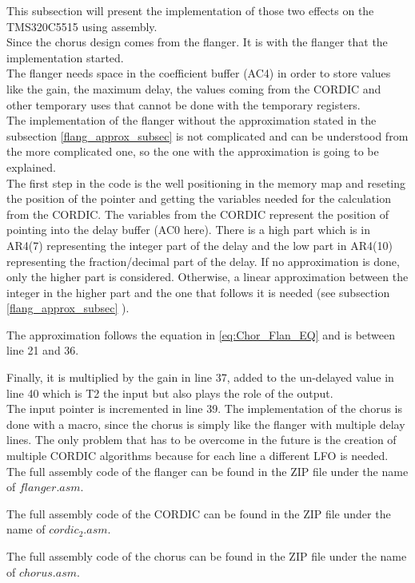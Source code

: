 This subsection will present the implementation of those two effects on the TMS320C5515 using assembly. \\
Since the chorus design comes from the flanger. It is with the flanger that the implementation started. \\
The flanger needs space in the coefficient buffer (AC4) in order to store values like the gain, the maximum delay, the values coming from the CORDIC and other temporary uses that cannot be done with the temporary registers. \\
The implementation of the flanger without the approximation stated in the subsection \ref{flang_approx_subsec} is not complicated and can be understood from the more complicated one, so the one with the approximation is going to be explained. \\
The first step in the code is the well positioning in the memory map and reseting the position of the pointer and getting the variables needed for the calculation from the CORDIC.
The variables from the CORDIC represent the position of pointing into the delay buffer (AC0 here). There is a high part which is in AR4(7) representing the integer part of the delay and the low part in AR4(10) representing the fraction/decimal part of the delay. If no approximation is done, only the higher part is considered. Otherwise, a linear approximation between the integer in the higher part and the one that follows it is needed (see subsection \ref{flang_approx_subsec} ). 

The approximation follows the equation in \ref{eq:Chor_Flan_EQ} and is between line 21 and 36. 


Finally, it is multiplied by the gain in line 37, added to the un-delayed value in line 40 which is T2 the input but also plays the role of the output. \\
The input pointer is incremented in line 39. 
The implementation of the chorus is done with a macro, since the chorus is simply like the flanger with multiple delay lines. The only problem that has to be overcome in the future is the creation of multiple CORDIC algorithms because for each line a different LFO is needed. \\

The full assembly code of the flanger can be found in the ZIP file under the name of $flanger.asm$. 

The full assembly code of the CORDIC can be found in the ZIP file under the name of $cordic_2.asm$. 

The full assembly code of the chorus can be found in the ZIP file under the name of $chorus.asm$. 